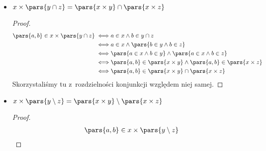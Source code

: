 \begin{itemize}
\begin{proof}
\begin{equation*}
\begin{split}
                        \iff& \pars{\exists_{a \in x} \ \exists_{b \in y} \ \xi = \pars{a, b}} \lor \pars{\exists_{a \in x} \ \exists_{b \in z} \ \xi = \pars{a, b}} \\
                        \iff& \xi \in \pars{x \times y} \lor \xi \in \pars{x \times z} \\
                        \iff& \xi \in \pars{x \times y} \cup \pars{x \times z}
                \end{split}
            \end{equation*}
            Skorzystaliśmy tutaj z~rozdzielności konjunkcji względem alternatywy oraz z~faktu, że
            \begin{equation*}
                \exists_v \ \pars{\varphi \lor \psi} \iff \pars{\exists_v \ \varphi} \lor \pars{\exists_v \ \psi}
            \end{equation*}
        \end{proof}
    \item \(x \times \pars{y \cap z} = \pars{x \times y} \cap \pars{x \times z}\)
        \begin{proof}
            \begin{equation*}
                \begin{split}
                    \pars{a, b} \in x \times \pars{y \cap z}
                        \iff& a \in x \land b \in y \cap  z\\
                        \iff& a \in x \land \pars{b \in y \land b \in z }\\
                        \iff& \pars{a \in x \land b \in y} \land \pars{a \in x \land b \in z }\\
                        \iff& \pars{a, b} \in \pars{x \times y} \land \pars{a, b} \in \pars{x \times z }\\
                        \iff& \pars{a, b} \in \pars{x \times y} \cap \pars{x \times z}
                \end{split}
            \end{equation*}
            Skorzystaliśmy tu z~rozdzielności konjunkcji względem niej samej.
        \end{proof}
    \item \(x \times \pars{y \setminus z} = \pars{x \times y} \setminus \pars{x \times z}\)
        \begin{proof}
            \begin{equation*}
                \begin{split}
                    \pars{a, b} \in x \times \pars{y \setminus z}

\end{split}
\end{equation*}
\end{proof}
\end{itemize}
